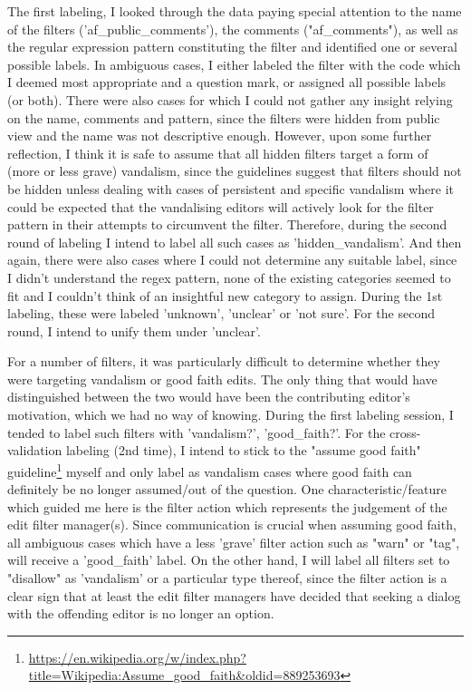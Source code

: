 The first labeling, I looked through the data paying special attention to the name of the filters ('af\_public\_comments'), the comments ("af\_comments"), as well as the regular expression pattern constituting the filter and identified one or several possible labels. %
In ambiguous cases, I either labeled the filter with the code which I deemed most appropriate and a question mark, or assigned all possible labels (or both).
There were also cases for which I could not gather any insight relying on the name, comments and pattern, since the filters were hidden from public view and the name was not descriptive enough.
However, upon some further reflection, I think it is safe to assume that all hidden filters target a form of (more or less grave) vandalism, since the guidelines suggest that filters should not be hidden unless dealing with cases of persistent and specific vandalism where it could be expected that the vandalising editors will actively look for the filter pattern in their attempts to circumvent the filter\cite{Wikipedia:EditFilter}.
Therefore, during the second round of labeling I intend to label all such cases as 'hidden\_vandalism'.
And then again, there were also cases where I could not determine any suitable label, since I didn't understand the regex pattern, none of the existing categories seemed to fit and I couldn't think of an insightful new category to assign.
During the 1st labeling, these were labeled 'unknown', 'unclear' or 'not sure'.
For the second round, I intend to unify them under 'unclear'.

For a number of filters, it was particularly difficult to determine whether they were targeting vandalism or good faith edits.
The only thing that would have distinguished between the two would have been the contributing editor's motivation, which we had no way of knowing.
During the first labeling session, I tended to label such filters with 'vandalism?', 'good\_faith?'.
For the cross-validation labeling (2nd time), I intend to stick to the "assume good faith" guideline\footnote{\url{https://en.wikipedia.org/w/index.php?title=Wikipedia:Assume_good_faith&oldid=889253693}} myself
and only label as vandalism cases where good faith can definitely be no longer assumed/out of the question.
One characteristic/feature which guided me here is the filter action which represents the judgement of the edit filter manager(s).
Since communication is crucial when assuming good faith, all ambiguous cases which have a less 'grave' filter action such as "warn" or "tag", will receive a 'good\_faith' label.
On the other hand, I will label all filters set to "disallow" as 'vandalism' or a particular type thereof, since the filter action is a clear sign that at least the edit filter managers have decided that seeking a dialog with the offending editor is no longer an option.

